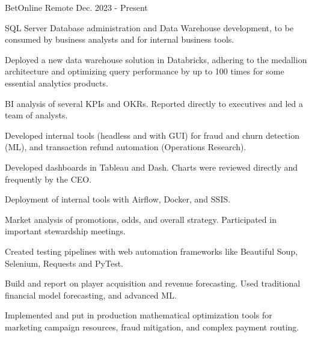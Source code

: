 

\begin{cventries}

	{BetOnline} %
	{Remote} %
	{Dec. 2023 {-} Present} %
	{
		\begin{cvitems} %
			\item {SQL Server Database administration and Data Warehouse development, to be consumed by business analysts and for internal business tools.}
			\item {Deployed a new data warehouse solution in Databricks, adhering to the medallion architecture and optimizing query performance by up to 100 times for some essential analytics products.}
			\item {BI analysis of several KPIs and OKRs. Reported directly to executives and led a team of analysts.}
			\item {Developed internal tools (headless and with GUI) for fraud and churn detection (ML), and transaction refund automation (Operations Research).}
			\item {Developed dashboards in Tableau and Dash. Charts were reviewed directly and frequently by the CEO.}
			\item {Deployment of internal tools with Airflow, Docker, and SSIS.}
			\item {Market analysis of promotions, odds, and overall strategy. Participated in important stewardship meetings.}
			\item {Created testing pipelines with web automation frameworks like Beautiful Soup, Selenium, Requests and PyTest.}
			\item {Build and report on player acquisition and revenue forecasting. Used traditional financial model forecasting, and advanced ML.}
			\item {Implemented and put in production mathematical optimization tools for marketing campaign resources, fraud mitigation, and complex payment routing.}
		\end{cvitems}
	}


\end{cventries}
